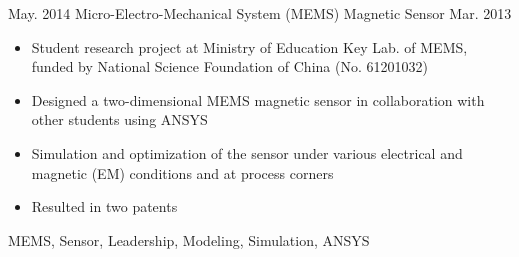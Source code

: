 \begin{projects}
  \project
    {May. 2014}   {Micro-Electro-Mechanical System (MEMS) Magnetic Sensor}
    {Mar. 2013} {
                      \begin{itemize}
                        \item Student research project at Ministry of Education Key Lab. of MEMS, funded by National Science Foundation of China (No. 61201032)
                        \item Designed a two-dimensional MEMS magnetic sensor in collaboration with other students using ANSYS
                        \item Simulation and optimization of the sensor under various electrical and magnetic (EM) conditions and at process corners
                        \item Resulted in two patents
                      \end{itemize}
                    }
                    {MEMS, Sensor, Leadership, Modeling, Simulation, ANSYS}

\end{projects}

